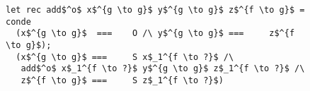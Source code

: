 \begin{figure}[!t]
  \centering
  \begin{minipage}{\columnwidth}
    \begin{lstlisting}[frame=tb]
let rec add$^o$ x$^{g \to g}$ y$^{g \to g}$ z$^{f \to g}$ = conde
  (x$^{g \to g}$  ===    O /\ y$^{g \to g}$ ===     z$^{f \to g}$);
  (x$^{g \to g}$ ===     S x$_1^{f \to ?}$ /\
   add$^o$ x$_1^{f \to ?}$ y$^{g \to g}$ z$_1^{f \to ?}$ /\
   z$^{f \to g}$ ===     S z$_1^{f \to ?}$)
    \end{lstlisting}
  \end{minipage}
\end{figure}